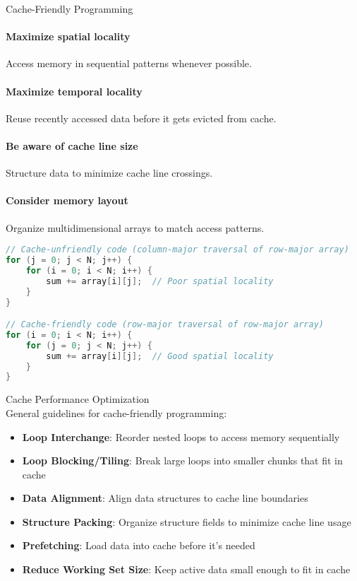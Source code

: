 \begin{KR}{Cache-Friendly Programming}
\paragraph{Maximize spatial locality}
Access memory in sequential patterns whenever possible.
\paragraph{Maximize temporal locality}
Reuse recently accessed data before it gets evicted from cache.
\paragraph{Be aware of cache line size}
Structure data to minimize cache line crossings.
\paragraph{Consider memory layout}
Organize multidimensional arrays to match access patterns.

\begin{lstlisting}[language=C, style=basesmol]
// Cache-unfriendly code (column-major traversal of row-major array)
for (j = 0; j < N; j++) {
    for (i = 0; i < N; i++) {
        sum += array[i][j];  // Poor spatial locality
    }
}

// Cache-friendly code (row-major traversal of row-major array)
for (i = 0; i < N; i++) {
    for (j = 0; j < N; j++) {
        sum += array[i][j];  // Good spatial locality
    }
}
\end{lstlisting}
\end{KR}

\begin{concept}{Cache Performance Optimization}\\
General guidelines for cache-friendly programming:
\begin{itemize}
    \item \textbf{Loop Interchange}: Reorder nested loops to access memory sequentially
    \item \textbf{Loop Blocking/Tiling}: Break large loops into smaller chunks that fit in cache
    \item \textbf{Data Alignment}: Align data structures to cache line boundaries
    \item \textbf{Structure Packing}: Organize structure fields to minimize cache line usage
    \item \textbf{Prefetching}: Load data into cache before it's needed
    \item \textbf{Reduce Working Set Size}: Keep active data small enough to fit in cache
\end{itemize}
\end{concept}

